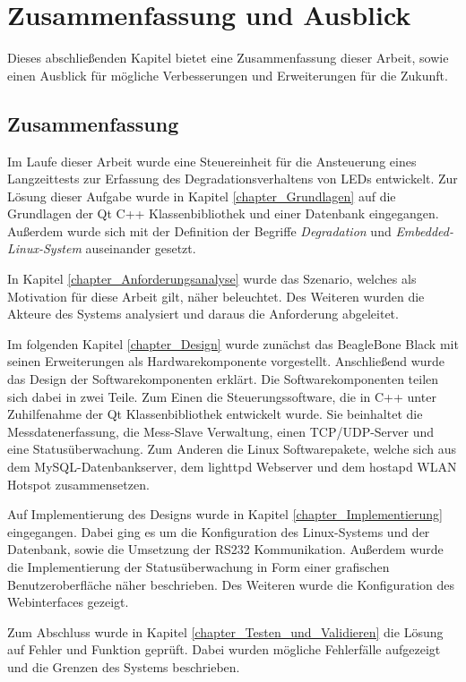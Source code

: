 \chapter{Zusammenfassung und Ausblick}
\label{chapter_FazitUndAusblick}

Dieses abschließenden Kapitel bietet eine Zusammenfassung dieser Arbeit, sowie einen Ausblick für mögliche Verbesserungen und Erweiterungen für die Zukunft.

\section{Zusammenfassung}
Im Laufe dieser Arbeit wurde eine Steuereinheit für die Ansteuerung eines Langzeittests zur Erfassung des Degradationsverhaltens von \acp{LED} entwickelt. Zur Lösung dieser Aufgabe wurde in Kapitel \ref{chapter_Grundlagen} auf die Grundlagen der Qt C++ Klassenbibliothek und einer Datenbank eingegangen. Außerdem wurde sich mit der Definition der Begriffe \textit{Degradation} und \textit{Embedded-Linux-System} auseinander gesetzt.\ 

In Kapitel \ref{chapter_Anforderungsanalyse} wurde das Szenario, welches als Motivation für diese Arbeit gilt, näher beleuchtet. Des Weiteren wurden die Akteure des Systems analysiert und daraus die Anforderung abgeleitet.\ 

Im folgenden Kapitel \ref{chapter_Design} wurde zunächst das BeagleBone Black mit seinen Erweiterungen als Hardwarekomponente vorgestellt. Anschließend wurde das Design der Softwarekomponenten erklärt. Die Softwarekomponenten teilen sich dabei in zwei Teile. Zum Einen die Steuerungssoftware, die in C++ unter Zuhilfenahme der Qt Klassenbibliothek entwickelt wurde. Sie beinhaltet die Messdatenerfassung, die Mess-Slave Verwaltung, einen TCP/UDP-Server und eine Statusüberwachung. Zum Anderen die Linux Softwarepakete, welche sich aus dem MySQL-Datenbankserver, dem lighttpd Webserver und dem hostapd WLAN Hotspot zusammensetzen.\ 

Auf Implementierung des Designs wurde in Kapitel \ref{chapter_Implementierung} eingegangen. Dabei ging es um die Konfiguration des Linux-Systems und der Datenbank, sowie die Umsetzung der RS232 Kommunikation. Außerdem wurde die Implementierung der Statusüberwachung in Form einer grafischen Benutzeroberfläche näher beschrieben. Des Weiteren wurde die Konfiguration des Webinterfaces gezeigt.\ 

Zum Abschluss wurde in Kapitel \ref{chapter_Testen_und_Validieren} die Lösung auf Fehler und Funktion geprüft. Dabei wurden mögliche Fehlerfälle aufgezeigt und die Grenzen des Systems beschrieben.

